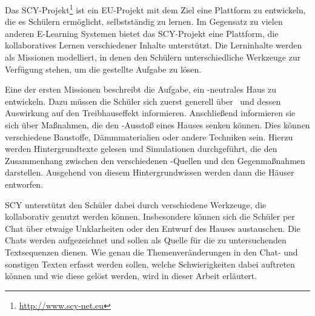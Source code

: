 Das SCY-Projekt\footnote{\href{http://www.scy-net.eu}{http://www.scy-net.eu}} ist ein EU-Projekt mit dem Ziel eine Plattform zu entwickeln, die es Schülern ermöglicht, selbstständig zu lernen. Im Gegensatz zu vielen anderen E-Learning Systemen bietet das SCY-Projekt eine Plattform, die kollaboratives Lernen verschiedener Inhalte unterstützt. Die Lerninhalte werden als Missionen modelliert, in denen den Schülern unterschiedliche Werkzeuge zur Verfügung stehen, um die gestellte Aufgabe zu lösen. 

Eine der ersten Missionen beschreibt die Aufgabe, ein \COTWO-neutrales Haus zu entwickeln. Dazu müssen die Schüler sich zuerst generell über \COTWO\  und dessen Auswirkung auf den Treibhauseffekt informieren. Anschließend informieren sie sich über Maßnahmen, die den \COTWO-Ausstoß eines Hauses senken können. Dies können verschiedene Baustoffe, Dämmmaterialien oder andere Techniken sein. Hierzu werden Hintergrundtexte gelesen und Simulationen  durchgeführt, die den Zusammenhang zwischen den verschiedenen \COTWO-Quellen und den Gegenmaßnahmen darstellen. Ausgehend von diesem Hintergrundwissen werden dann die Häuser entworfen. 

SCY unterstützt den Schüler dabei durch verschiedene Werkzeuge, die kollaborativ genutzt werden können. Insbesondere können sich die Schüler per Chat über etwaige Unklarheiten oder den Entwurf des Hauses austauschen. Die Chats werden aufgezeichnet und sollen als Quelle für die zu untersuchenden Textsequenzen dienen. Wie genau die Themenveränderungen in den Chat- und sonstigen Texten erfasst werden sollen, welche Schwierigkeiten dabei auftreten können und wie diese gelöst werden, wird in dieser Arbeit erläutert. 






